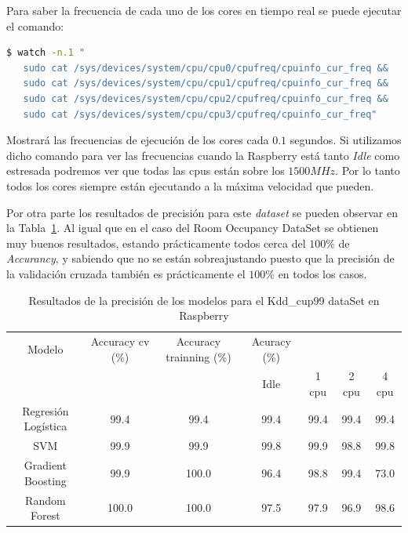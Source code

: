 \documentclass[a4paper, 12pt]{book}
\begin{document}
Para saber la frecuencia de cada uno de los cores en tiempo real se puede ejecutar el comando:\\

\begin{lstlisting}[language=bash, showstringspaces=false]
   $ watch -n.1 "
   sudo cat /sys/devices/system/cpu/cpu0/cpufreq/cpuinfo_cur_freq && 
   sudo cat /sys/devices/system/cpu/cpu1/cpufreq/cpuinfo_cur_freq && 
   sudo cat /sys/devices/system/cpu/cpu2/cpufreq/cpuinfo_cur_freq && 
   sudo cat /sys/devices/system/cpu/cpu3/cpufreq/cpuinfo_cur_freq"
\end{lstlisting}

Mostrará las frecuencias de ejecución de los cores cada $0.1$ segundos. Si utilizamos dicho comando para ver las frecuencias cuando la Raspberry está tanto \textit{Idle} como estresada podremos ver que todas las cpus están sobre los $1500MHz$. Por lo tanto todos los cores siempre están ejecutando a la máxima velocidad que pueden.

Por otra parte los resultados de precisión para este \textit{dataset} se pueden observar en la Tabla~\ref{tab:acc_Kddraspberry}. Al igual que en el caso del Room Occupancy DataSet se obtienen muy buenos resultados, estando prácticamente todos cerca del $100\%$ de \textit{Accurancy}, y sabiendo que no se están sobreajustando puesto que la precisión de la validación cruzada también es prácticamente el $100\%$ en todos los casos.

\begin{table}[]
\begin{adjustbox}{width=\textwidth}
\centering
    \begin{tabular}{c  c  c  c  c  c  c}
    \hline
    Modelo & Accuracy cv (\%) & Accuracy trainning (\%) & Acuracy (\%) & & & \\
    \cline{4-7}
     &  &   &  Idle & 1 cpu & 2 cpu & 4 cpu \\
     \hline
     Regresión Logística & 99.4 & 99.4 & 99.4 & 99.4 & 99.4 & 99.4\\
     SVM & 99.9 & 99.9 & 99.8 & 99.9 & 98.8 & 99.8\\
     Gradient Boosting & 99.9 & 100.0 & 96.4 & 98.8 & 99.4 & 73.0\\
     Random Forest & 100.0 & 100.0 & 97.5 & 97.9 & 96.9 & 98.6\\
    \hline
    \end{tabular}
\end{adjustbox}
\caption{Resultados de la precisión de los modelos para el Kdd\_cup99 dataSet en Raspberry}
\label{tab:acc_Kddraspberry}
\end{table}
\end{document}
